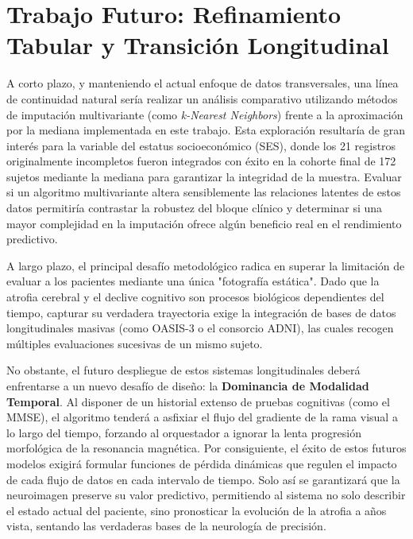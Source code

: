 \documentclass[12pt, oneside, english, spanish]{book}
\begin{document}
\section{Trabajo Futuro: Refinamiento Tabular y Transición Longitudinal} \label{sec:trabajo_futuro}

A corto plazo, y manteniendo el actual enfoque de datos transversales, una línea de continuidad natural sería realizar un análisis comparativo utilizando métodos de imputación multivariante (como \textit{k-Nearest Neighbors}) frente a la aproximación por la mediana implementada en este trabajo. Esta exploración resultaría de gran interés para la variable del estatus socioeconómico (SES), donde los 21 registros originalmente incompletos fueron integrados con éxito en la cohorte final de 172 sujetos mediante la mediana para garantizar la integridad de la muestra. Evaluar si un algoritmo multivariante altera sensiblemente las relaciones latentes de estos datos permitiría contrastar la robustez del bloque clínico y determinar si una mayor complejidad en la imputación ofrece algún beneficio real en el rendimiento predictivo.

A largo plazo, el principal desafío metodológico radica en superar la limitación de evaluar a los pacientes mediante una única "fotografía estática". Dado que la atrofia cerebral y el declive cognitivo son procesos biológicos dependientes del tiempo, capturar su verdadera trayectoria exige la integración de bases de datos longitudinales masivas (como OASIS-3 o el consorcio ADNI), las cuales recogen múltiples evaluaciones sucesivas de un mismo sujeto.  

No obstante, el futuro despliegue de estos sistemas longitudinales deberá enfrentarse a un nuevo desafío de diseño: la \textbf{Dominancia de Modalidad Temporal}. Al disponer de un historial extenso de pruebas cognitivas (como el MMSE), el algoritmo tenderá a asfixiar el flujo del gradiente de la rama visual a lo largo del tiempo, forzando al orquestador a ignorar la lenta progresión morfológica de la resonancia magnética. Por consiguiente, el éxito de estos futuros modelos exigirá formular funciones de pérdida dinámicas que regulen el impacto de cada flujo de datos en cada intervalo de tiempo. Solo así se garantizará que la neuroimagen preserve su valor predictivo, permitiendo al sistema no solo describir el estado actual del paciente, sino pronosticar la evolución de la atrofia a años vista, sentando las verdaderas bases de la neurología de precisión.


\end{document}
